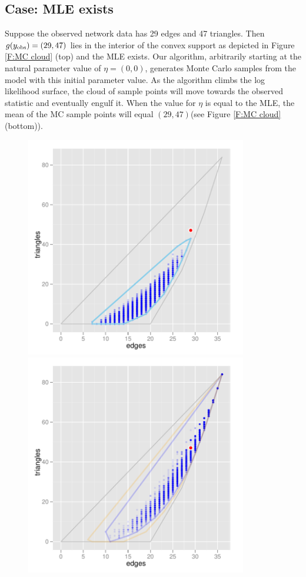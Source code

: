 \subsection{Case: MLE exists}
Suppose the observed network data has 29 edges and 47 triangles.  Then $g(y_{\text{obs}}) = (29,47)$
lies in the interior of the convex support as depicted in Figure \ref{F:MC cloud} 
(top) and the MLE exists.
Our algorithm, arbitrarily starting at the natural parameter value of $\eta = (0,0)$, 
generates Monte Carlo samples from the model with this initial parameter value.  As 
the algorithm climbs the log likelihood surface, 
the cloud of sample points will move towards 
the observed statistic and eventually engulf it.  
When the value for $\eta$ is equal to the MLE, the mean of the MC sample points will 
equal $(29,47)$(see Figure \ref{F:MC cloud} (bottom)).  
\begin{figure}[!ht]
\centering
\includegraphics[width=3.8in]{Figures/MCsample-far}
\includegraphics[width=3.8in]{Figures/MCsample-MLE}

\end{figure}
